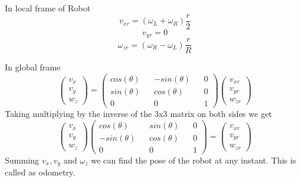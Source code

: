 \documentclass[12pt]{article}
\begin{document}

In local frame of Robot
\begin{equation}v_{xr} = (\omega_{L} + \omega_{R})\frac{r}{2}\end{equation}
\begin{equation}
    v_{yr} = 0
\end{equation}
\begin{equation}
\omega_{zr} = (\omega_{R} - \omega_{L})\frac{r}{R}    
\end{equation}



In global frame
\begin{equation}
    \begin{pmatrix}
    v_{x} \\
    v_{y} \\
    w_{z}
    \end{pmatrix}
     = 
    \begin{pmatrix}
    cos(\theta)  &&-sin(\theta)  &&0 \\
    sin(\theta)  &&cos(\theta)  &&0  \\
    0  &&0  &&1
    \end{pmatrix}
    \begin{pmatrix}
    v_{xr} \\
    v_{yr} \\
    w_{zr}
    \end{pmatrix}
\end{equation}
Taking multiplying by the inverse of the 3x3 matrix on both sides we get
\begin{equation}
    \begin{pmatrix}
    v_{x} \\
    v_{y} \\
    w_{z}
    \end{pmatrix}
    \begin{pmatrix}
    cos(\theta)  &&sin(\theta)  &&0 \\
    -sin(\theta)  &&cos(\theta)  &&0  \\
    0  &&0  &&1
    \end{pmatrix}
     = 
    \begin{pmatrix}
    v_{xr} \\
    v_{yr} \\
    w_{zr}
    \end{pmatrix}
\end{equation}
Summing $ v_{x}, v_{y} $ and $ \omega_{z}$ we can find the pose of the robot at any instant. This is called as odometry.
\end{document}
